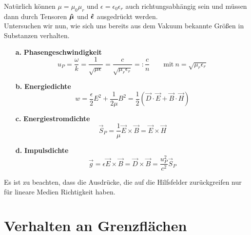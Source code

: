 Natürlich können $\mu=\mu_0\mu_r$ und $\epsilon=\epsilon_0\epsilon_r$ auch richtungsabhängig sein und müssen dann durch Tensoren $\bm{\hat{\mu}}$ und $\bm{\hat{\epsilon}}$ ausgedrückt werden.\\

Untersuchen wir nun, wie sich uns bereits aus dem Vakuum bekannte Größen in Substanzen verhalten.
\begin{enumerate}
		\item[\textbf{a.}] \textbf{Phasengeschwindigkeit}
		\begin{equation*}
		u_P=\frac{\omega}{k}=\frac{1}{\sqrt{\mu\epsilon}}=\frac{c}{\sqrt{\mu_r\epsilon_r}} =: \frac{c}{n}\quad\quad\text{mit}\ n=\sqrt{\mu_r\epsilon_r}
		\end{equation*}
		\item[\textbf{b.}] \textbf{Energiedichte}
		\begin{equation*}
		w=\frac{\epsilon}{2}E^2 + \frac{1}{2\mu}B^2 = \frac{1}{2}\left(\vec{D}\cdot\vec{E}+\vec{B}\cdot\vec{H}\right)
		\end{equation*}
		\item[\textbf{c.}] \textbf{Energiestromdichte}
		\begin{equation*}
		\vec{S}_P = \frac{1}{\mu}\vec{E}\times\vec{B} = \vec{E}\times\vec{H}
		\end{equation*}
		\item[\textbf{d.}] \textbf{Impulsdichte}
		\begin{equation*}
		\vec{g}=\epsilon\vec{E}\times\vec{B}=\vec{D}\times\vec{B}=\frac{u_P^2}{c^2}\vec{S}_P
		\end{equation*}
\end{enumerate}
Es ist zu beachten, dass die Ausdrücke, die auf die Hilfsfelder zurückgreifen nur für lineare Medien Richtigkeit haben.
\newpage
\section{Verhalten an Grenzflächen}

